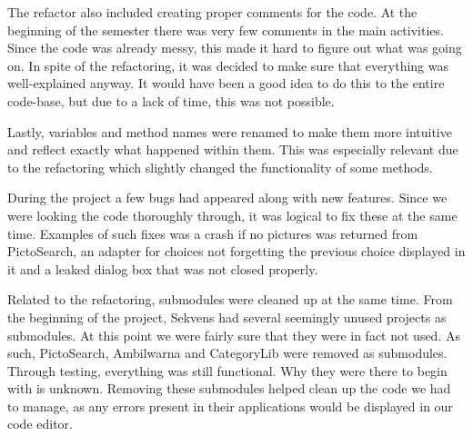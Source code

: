 The refactor also included creating proper comments for the code. At the beginning of the semester there was very few comments in the main activities. Since the code was already messy, this made it hard to figure out what was going on. In spite of the refactoring, it was decided to make sure that everything was well-explained anyway. It would have been a good idea to do this to the entire code-base, but due to a lack of time, this was not possible.

Lastly, variables and method names were renamed to make them more intuitive and reflect exactly what happened within them. This was especially relevant due to the refactoring which slightly changed the functionality of some methods.

During the project a few bugs had appeared along with new features. Since we were looking the code thoroughly through, it was logical to fix these at the same time. Examples of such fixes was a crash if no pictures was returned from PictoSearch, an adapter for choices not forgetting the previous choice displayed in it and a leaked dialog box that was not closed properly.

Related to the refactoring, submodules were cleaned up at the same time. From the beginning of the project, Sekvens had several seemingly unused projects as submodules. At this point we were fairly sure that they were in fact not used. As such, PictoSearch, Ambilwarna and CategoryLib were removed as submodules. Through testing, everything was still functional. Why they were there to begin with is unknown. Removing these submodules helped clean up the code we had to manage, as any errors present in their applications would be displayed in our code editor.